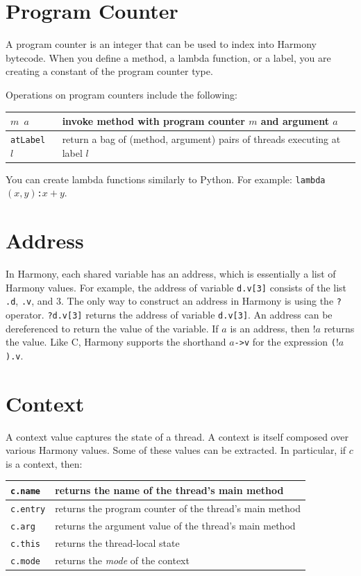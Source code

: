 \documentclass{report}
\begin{document}
\section{Program Counter}

A program counter is an integer that can be used to index into Harmony
bytecode.  When you define a method, a lambda function, or a label,
you are creating a constant of the program counter type.

Operations on program counters include the following:
\begin{center}
\begin{tabular}{|l|l|}
\hline
\texttt{$m$ $a$} & invoke method with program counter $m$ and argument $a$\\
\hline
\texttt{atLabel $l$} & return a bag of (method, argument) pairs of threads executing at label $l$ \\
\hline
\end{tabular}
\end{center}

You can create lambda functions similarly to Python.  For example:
\texttt{lambda$(x,y)$:$x+y$}.

\section{Address}

In Harmony, each shared variable has an address, which is essentially
a list of Harmony values.
For example, the address of variable \texttt{d.v[3]} consists of the
list \texttt{.d}, \texttt{.v}, and 3.  The only way to construct an
address in Harmony is using the \texttt{?} operator.
\texttt{?d.v[3]} returns the address of variable \texttt{d.v[3]}.
An address can be dereferenced to return the value of the variable.
If $a$ is an address, then $!a$ returns the value.
Like C, Harmony supports the shorthand \texttt{$a$->v} for 
the expression \texttt{($!a$).v}.

\section{Context}

A context value captures the state of a thread.
A context is itself composed over various Harmony values.
Some of these values can be extracted.  In particular, if $c$
is a context, then:

\begin{center}
\begin{tabular}{|l|l|}
\hline
\texttt{\texttt{c}.name} & returns the name of the thread's main method \\
\hline
\texttt{\texttt{c}.entry} & returns the program counter of the thread's main method \\
\hline
\texttt{\texttt{c}.arg} & returns the argument value of the thread's main method \\
\hline
\texttt{\texttt{c}.this} & returns the thread-local state \\
\hline
\texttt{\texttt{c}.mode} & returns the \emph{mode} of the context \\
\hline
\end{tabular}
\end{center}
\end{document}
